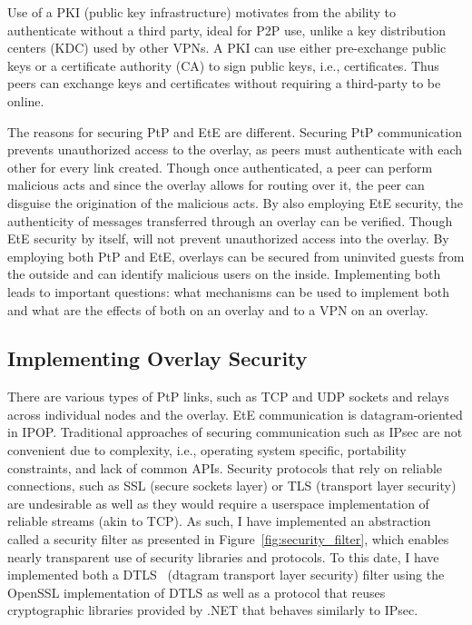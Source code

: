 Use of a PKI (public key infrastructure) motivates from the ability to
authenticate without a third party, ideal for P2P use, unlike a key
distribution centers (KDC) used by other VPNs.  A PKI can use either
pre-exchange public keys or a certificate authority (CA) to sign public keys,
i.e., certificates.  Thus peers can exchange keys and certificates without
requiring a third-party to be online.

The reasons for securing PtP and EtE are different.  Securing PtP communication
prevents unauthorized access to the overlay, as peers must authenticate with
each other for every link created.  Though once authenticated, a peer can
perform malicious acts and since the overlay allows for routing over it, the
peer can disguise the origination of the malicious acts.  By also employing EtE
security, the authenticity of messages transferred through an overlay can be
verified.  Though EtE security by itself, will not prevent unauthorized access
into the overlay.  By employing both PtP and EtE, overlays can be secured from
uninvited guests from the outside and can identify malicious users on the
inside.  Implementing both leads to important questions: what mechanisms can be
used to implement both and what are the effects of both on an overlay and to a
VPN on an overlay.

\subsection{Implementing Overlay Security}

There are various types of PtP links, such as TCP and UDP sockets and relays
across individual nodes and the overlay.  EtE communication is
datagram-oriented in IPOP.  Traditional approaches of securing communication
such as IPsec are not convenient due to complexity, i.e., operating system
specific, portability constraints, and lack of common APIs.  Security protocols
that rely on reliable connections, such as SSL (secure sockets layer) or TLS
(transport layer security) are undesirable as well as they would require a
userspace implementation of reliable streams (akin to TCP).  As such, I have
implemented an abstraction called a security filter as presented in
Figure~\ref{fig:security_filter}, which enables nearly transparent use of
security libraries and protocols.  To this date, I have implemented both a
DTLS~\cite{dtls} (dtagram transport layer security) filter using the OpenSSL
implementation of DTLS as well as a protocol that reuses cryptographic
libraries provided by .NET that behaves similarly to IPsec.

